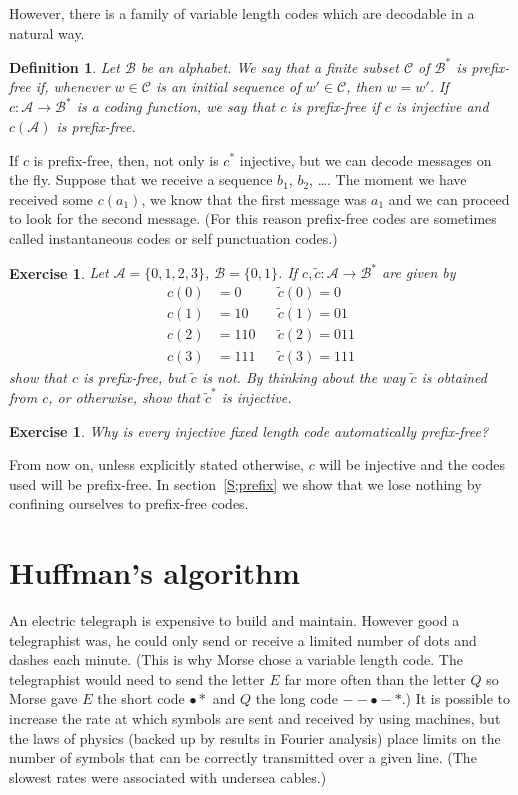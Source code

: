 \documentclass[12pt,a4paper]{article}
\theoremstyle{plain}
\newtheorem{definition}[theorem]{Definition}
\newtheorem{exercise}[theorem]{Exercise}
\theoremstyle{definition}
\begin{document}
However, there is a family of variable length codes
which are decodable in a natural way.
\begin{definition} Let ${\mathcal B}$ be an alphabet. We say that
a finite subset ${\mathcal C}$ of ${\mathcal B}^{*}$
is \emph{prefix-free} if, 
whenever $w\in{\mathcal C}$ is an initial sequence
of $w'\in{\mathcal C}$, then $w=w'$. 
If $c:{\mathcal A}\rightarrow{\mathcal B}^{*}$
is a coding function, we say that $c$ is prefix-free if $c$ is injective
and $c({\mathcal A})$
is prefix-free.
\end{definition}

If $c$ is prefix-free, then, not only is $c^{*}$ injective, but we can decode
messages on the fly. Suppose that we receive a sequence 
$b_{1}$, $b_{2}$, \dots.
The moment we have received some $c(a_{1})$, we know that 
the first message was $a_{1}$
and we can proceed to look for the second message. (For this reason
prefix-free codes
are sometimes called instantaneous codes or self punctuation codes.)
\begin{exercise} Let  ${\mathcal A}=\{0,1,2,3\}$, ${\mathcal B}=\{0,1\}$.
If $c,\tilde{c}:{\mathcal A}\rightarrow{\mathcal B}^{*}$ are given by
\begin{align*}
c(0)&=0&&\tilde{c}(0)=0\\
c(1)&=10&&\tilde{c}(1)=01\\
c(2)&=110&&\tilde{c}(2)=011\\
c(3)&=111&&\tilde{c}(3)=111
\end{align*}
show that $c$ is prefix-free, but $\tilde{c}$ is not.
By thinking about the way $\tilde{c}$ is obtained from $c$, or otherwise,
show that $\tilde{c}^{*}$ is injective.
\end{exercise}
\begin{exercise}\label{E;auto free} 
Why is every injective fixed
length code automatically prefix-free?
\end{exercise}
From now on, unless explicitly stated otherwise, $c$ will be injective
and the codes used will be prefix-free. In section~\ref{S;prefix} 
we show
that we lose nothing by confining ourselves to prefix-free codes.
\section{Huffman's algorithm} An electric telegraph is expensive 
to build and maintain. However good a telegraphist was,
he could only send or receive a limited number of dots and dashes
each minute. (This is why  Morse chose a variable length code.
The telegraphist would need to send the letter $E$ far more often than
the letter $Q$ so Morse gave $E$ the short
code $\bullet*$ and $Q$ the long code $--\bullet-*$.)
It is possible to increase the rate at which symbols are
sent and received by using machines, but the laws of
physics (backed up by results in Fourier analysis)
place limits on the number of symbols that can be
correctly transmitted over a given line.
(The slowest rates were associated with undersea cables.)
\end{document}
